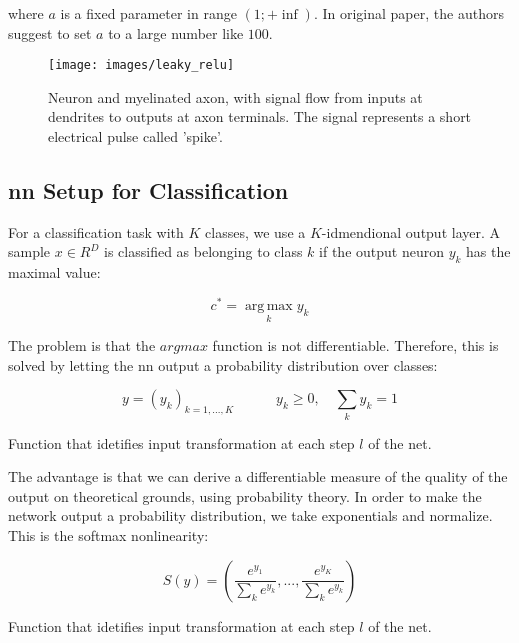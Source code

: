\noindent where $a$ is a fixed parameter in range $(1; +\inf)$. In original paper, the authors suggest to set $a$ to a large number like $100$.

\begin{figure}[H]
	\centering
	\texttt{[image: images/leaky\_relu]}
	\caption[Leaky Rectified linear activation.]{Neuron and myelinated axon, with signal flow from inputs at dendrites to outputs at axon terminals. The signal represents a short electrical pulse called 'spike'.}
	\label{fig:leakyrelu}
\end{figure}

\subsection{\gls{nn} Setup for Classification}
\label{nn:nnclassification}
For a classification task with $K$ classes, we use a $K$-idmendional output layer. A sample $x \in R^D$ is classified as belonging to class $k$ if the output neuron $y_k$ has the maximal value:

\begin{Equation}[H]
	\centering
	\begin{equation}
		c^*= \operatorname*{arg\,max}_k  y_k
	\end{equation}
	\label{eq:mathmodelaada}
\end{Equation}

\noindent The problem is that the $arg max$ function is not differentiable. Therefore, this is solved by letting the \gls{nn} output a probability distribution over classes:

\begin{Equation}[H]
	\centering
	\begin{equation}
		y = (y_k)_{k=1,...,K}
		\quad
		\quad
		\quad
		y_k \geq 0,
		\quad
		\sum_{k} y_k = 1
	\end{equation}
	\caption[Forward propagation.]{Function that idetifies input transformation at each step $l$ of the net.}
	\label{eq:activationfun}
\end{Equation}

\noindent The advantage is that we can derive a differentiable measure of the quality of the output on theoretical grounds, using probability theory. In order to make the network output a probability distribution, we take exponentials and normalize. This is the softmax nonlinearity:

\begin{Equation}[H]
	\centering
	\begin{equation}
		S(y) = (\frac{e^{y_1}}{\sum_k e^{y_k}},...,\frac{e^{y_K}}{\sum_k e^{y_k}})
	\end{equation}
	\caption[Forward propagation.]{Function that idetifies input transformation at each step $l$ of the net.}
	\label{eq:activationfun}
\end{Equation}

